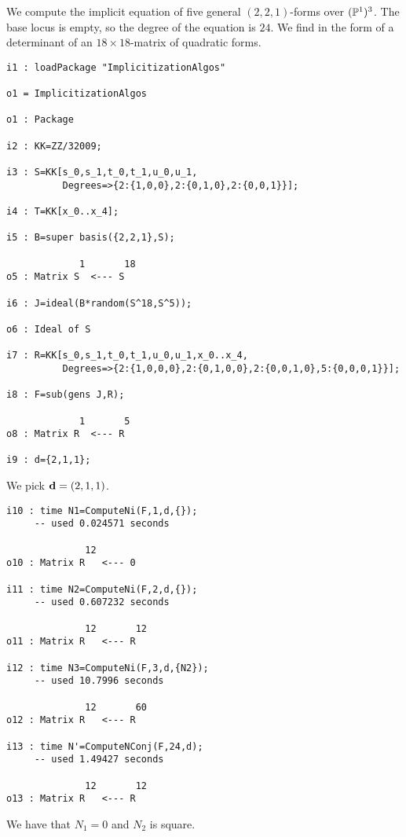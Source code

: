 \documentclass[fleqn,reqno]{amsart}
\begin{document}
\begin{example}[$\mt{ex602}$]
\label{ex602}
We compute the implicit equation of five general $(2,2,1)$-forms over $(\mathbb{P}^1)^3$.
The base locus is empty, so the degree of the equation is $24$.
We find in the form of a determinant of an $18\times18$-matrix of quadratic forms.

\begin{verbatim}
i1 : loadPackage "ImplicitizationAlgos"

o1 = ImplicitizationAlgos

o1 : Package

i2 : KK=ZZ/32009;

i3 : S=KK[s_0,s_1,t_0,t_1,u_0,u_1,
          Degrees=>{2:{1,0,0},2:{0,1,0},2:{0,0,1}}];

i4 : T=KK[x_0..x_4];

i5 : B=super basis({2,2,1},S);

             1       18
o5 : Matrix S  <--- S

i6 : J=ideal(B*random(S^18,S^5));

o6 : Ideal of S

i7 : R=KK[s_0,s_1,t_0,t_1,u_0,u_1,x_0..x_4,
          Degrees=>{2:{1,0,0,0},2:{0,1,0,0},2:{0,0,1,0},5:{0,0,0,1}}];

i8 : F=sub(gens J,R);

             1       5
o8 : Matrix R  <--- R

i9 : d={2,1,1};
\end{verbatim}
We pick $\mathbf d=(2,1,1)$.

\begin{verbatim}
i10 : time N1=ComputeNi(F,1,d,{});
     -- used 0.024571 seconds

              12
o10 : Matrix R   <--- 0

i11 : time N2=ComputeNi(F,2,d,{});
     -- used 0.607232 seconds

              12       12
o11 : Matrix R   <--- R

i12 : time N3=ComputeNi(F,3,d,{N2});
     -- used 10.7996 seconds

              12       60
o12 : Matrix R   <--- R

i13 : time N'=ComputeNConj(F,24,d);
     -- used 1.49427 seconds

              12       12
o13 : Matrix R   <--- R
\end{verbatim}
We have that $N_1=0$ and $N_2$ is square.
\end{example}
\end{document}
